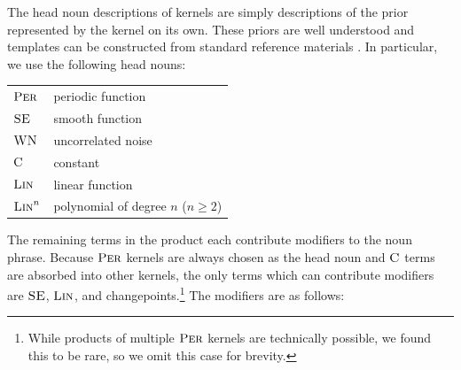 \documentclass[letterpaper]{article}
\begin{document}
The head noun descriptions of kernels are simply descriptions of the \gp{} prior represented by the kernel on its own.
These priors are well understood and templates can be constructed from standard reference materials \citep[e.g.][]{rasmussen38gaussian}.
In particular, we use the following head nouns: 

\begin{tabular}{ll}
${\textsc{Per}}$ & periodic function \\
${\textsc{SE}}$ & smooth function \\
${\textsc{WN}}$ & uncorrelated noise \\
${\textsc{C}}$ & constant \\
${\textsc{Lin}}$ & linear function \\
${\textsc{Lin}}^n$ & polynomial of degree $n$ ($n \geq 2$) \\
\end{tabular}


The remaining terms in the product each contribute modifiers to the noun phrase. Because ${\textsc{Per}}$ kernels are always chosen as the head noun and ${\textsc{C}}$ terms are absorbed into other kernels, the only terms which can contribute modifiers are ${\textsc{SE}}$, ${\textsc{Lin}}$, and changepoints.\footnote{While products of multiple ${\textsc{Per}}$ kernels are technically possible, we found this to be rare, so we omit this case for brevity.} The modifiers are as follows:
\end{document}
